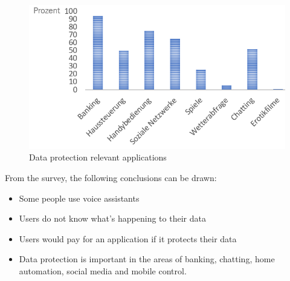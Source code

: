 \begin{figure}[h]
	\centering
	\includegraphics[width=0.9\linewidth]{Picture/umfrage_anwendung}
	\caption[Data protection relevant applications]{Data protection relevant applications}
	\label{fig:umfrage_anwendung}
\end{figure}

From the survey, the following conclusions can be drawn:
\begin{itemize}	
	\item Some people use voice assistants
	\item Users do not know what's happening to their data
	\item Users would pay for an application if it protects their data
	\item Data protection is important in the areas of banking, chatting, home automation, social media and mobile control.
\end{itemize}
